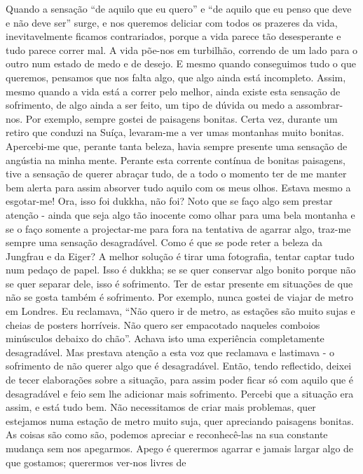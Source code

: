 Quando a sensação “de aquilo que eu quero” e “de aquilo
que eu penso que deve e não deve ser” surge, e nos queremos
deliciar com todos os prazeres da vida, inevitavelmente
ficamos contrariados, porque a vida parece tão desesperante e
tudo parece correr mal. A vida põe-nos em turbilhão, correndo
de um lado para o outro num estado de medo e de desejo. E
mesmo quando conseguimos tudo o que queremos, pensamos
que nos falta algo, que algo ainda está incompleto. Assim,
mesmo quando a vida está a correr pelo melhor, ainda existe
esta sensação de sofrimento, de algo ainda a ser feito, um tipo
de dúvida ou medo a assombrar-nos.
Por exemplo, sempre gostei de paisagens bonitas. Certa
vez, durante um retiro que conduzi na Suíça, levaram-me a
ver umas montanhas muito bonitas. Apercebi-me que, perante
tanta beleza, havia sempre presente uma sensação de angústia
na minha mente. Perante esta corrente contínua de bonitas
paisagens, tive a sensação de querer abraçar tudo, de a todo o
momento ter de me manter bem alerta para assim absorver
tudo aquilo com os meus olhos. Estava mesmo a esgotar-me!
Ora, isso foi dukkha, não foi?
Noto que se faço algo sem prestar atenção - ainda que
seja algo tão inocente como olhar para uma bela montanha e se o faço somente a projectar-me para fora na tentativa de
agarrar algo, traz-me sempre uma sensação desagradável.
Como é que se pode reter a beleza da Jungfrau e da Eiger? A
melhor solução é tirar uma fotografia, tentar captar tudo num
pedaço de papel. Isso é dukkha; se se quer conservar algo
bonito porque não se quer separar dele, isso é sofrimento. Ter
de estar presente em situações de que não se gosta também é
sofrimento.
Por exemplo, nunca gostei de viajar de metro em Londres.
Eu reclamava, “Não quero ir de metro, as estações são muito
sujas e cheias de posters horríveis. Não quero ser empacotado
naqueles comboios minúsculos debaixo do chão”. Achava
isto uma experiência completamente desagradável. Mas
prestava atenção a esta voz que reclamava e lastimava - o
sofrimento de não querer algo que é desagradável. Então,
tendo reflectido, deixei de tecer elaborações sobre a situação,
para assim poder ficar só com aquilo que é desagradável e
feio sem lhe adicionar mais sofrimento. Percebi que a situação
era assim, e está tudo bem. Não necessitamos de criar mais
problemas, quer estejamos numa estação de metro muito suja,
quer apreciando paisagens bonitas. As coisas são como são,
podemos apreciar e reconhecê-las na sua constante mudança
sem nos apegarmos. Apego é querermos agarrar e jamais
largar algo de que gostamos; querermos ver-nos livres de
